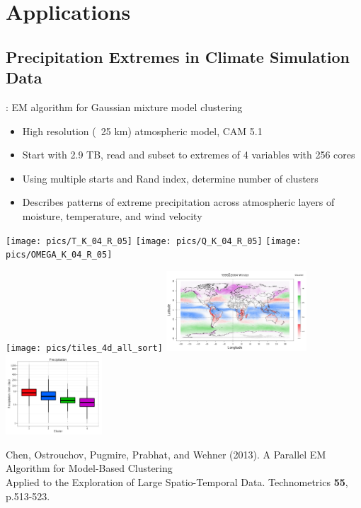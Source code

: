 \section{Applications}
\makesubcontentsslides



\subsection{Precipitation Extremes in Climate Simulation Data}
\begin{frame}
  \begin{block}{: EM algorithm for Gaussian mixture
      model clustering}
    \begin{minipage}{6cm}\scriptsize
      \begin{itemize}
      \item High resolution (~25 km) atmospheric model, CAM 5.1
      \item Start with 2.9 TB, read and subset to extremes of 4 variables with
        256 cores
      \item Using multiple starts and Rand index, determine number of clusters
      \item Describes patterns of extreme precipitation across
        atmospheric layers of moisture, temperature, and wind velocity
      \end{itemize}
    \end{minipage}
    \begin{minipage}{5.8cm}
      \texttt{[image: pics/T\_K\_04\_R\_05]}
      \texttt{[image: pics/Q\_K\_04\_R\_05]}
      \texttt{[image: pics/OMEGA\_K\_04\_R\_05]}
    \end{minipage}
    \vspace{-4.5ex}
    \begin{center}
      \texttt{[image: pics/tiles\_4d\_all\_sort]}
      \includegraphics[height=3cm]{pics/map_K_04_R_05}
      \includegraphics[trim=0mm 0mm 2mm 0mm,clip=true,height=3cm]{pics/PRECT_K_04_R_05}
    \end{center}
      \end{block}
\tiny Chen, Ostrouchov, Pugmire, Prabhat, and Wehner (2013). A
Parallel EM Algorithm for Model-Based Clustering \\[-2ex] Applied to the
Exploration of Large Spatio-Temporal Data. Technometrics {\bf 55}, p.513-523.
\end{frame}

